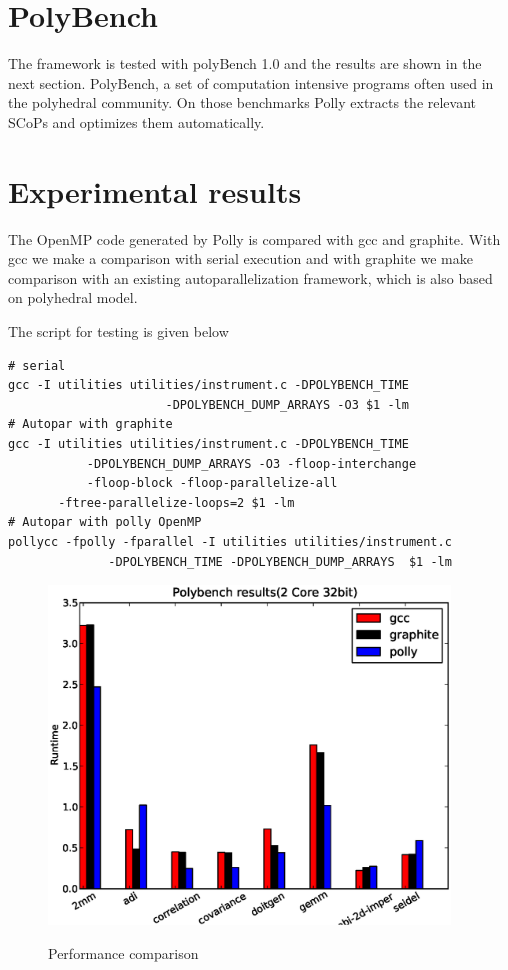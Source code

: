 \label{chap:testing}
\section{PolyBench}
The framework is tested with polyBench 1.0 and the results are shown in the next section.
PolyBench, a set of computation intensive programs often used in the polyhedral community.
On those benchmarks Polly extracts the relevant SCoPs and optimizes them automatically.

\section{Experimental results}

The OpenMP code generated by Polly is compared with gcc and graphite\cite{TRIFUNOVIC:2010}. With gcc
we make a comparison with serial execution and with graphite we make comparison
with an existing autoparallelization framework, which is also based on polyhedral
model.

The script for testing is given below
{\footnotesize
\begin{verbatim}
# serial
gcc -I utilities utilities/instrument.c -DPOLYBENCH_TIME 
                      -DPOLYBENCH_DUMP_ARRAYS -O3 $1 -lm
# Autopar with graphite
gcc -I utilities utilities/instrument.c -DPOLYBENCH_TIME
           -DPOLYBENCH_DUMP_ARRAYS -O3 -floop-interchange
           -floop-block -floop-parallelize-all 
	   -ftree-parallelize-loops=2 $1 -lm
# Autopar with polly OpenMP
pollycc -fpolly -fparallel -I utilities utilities/instrument.c
              -DPOLYBENCH_TIME -DPOLYBENCH_DUMP_ARRAYS  $1 -lm
\end{verbatim}
}
\begin{figure}
\begin{center}
  \label{fig:2core1}
  \includegraphics[height=9cm]{images/2core32bit.eps}
  \caption{Performance comparison}
\end{center}
\end{figure}

